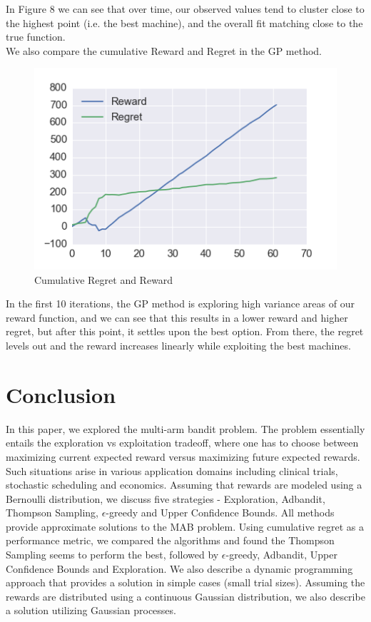 \documentclass{article}
\begin{document}
In Figure 8 we can see that over time, our observed values tend to cluster close to the highest point (i.e. the best machine), and the overall fit matching close to the true function.\\

We also compare the cumulative Reward and Regret in the GP method.

\begin{figure}[H]
\centering
\includegraphics[scale=0.8]{reward_regret.png}
\caption{Cumulative Regret and Reward}
\end{figure}

In the first 10 iterations, the GP method is exploring high variance areas of our reward function, and we can see that this results in a lower reward and higher regret, but after this point, it settles upon the best option. From there, the regret levels out and the reward increases linearly while exploiting the best machines.

\section{Conclusion}

In this paper, we explored the multi-arm bandit problem. The problem essentially entails the exploration vs exploitation tradeoff, where one has to choose between maximizing current expected reward versus maximizing future expected rewards. Such situations arise in various application domains including clinical trials, stochastic scheduling and economics. Assuming that rewards are modeled using a Bernoulli distribution, we discuss five strategies -  Exploration, Adbandit, Thompson Sampling, $\epsilon$-greedy and Upper Confidence Bounds. All methods provide approximate solutions to the MAB problem. Using cumulative regret as a performance metric, we compared the algorithms and found the Thompson Sampling seems to perform the best, followed by $\epsilon$-greedy, Adbandit, Upper Confidence Bounds and  Exploration. We also describe a dynamic programming approach that provides a solution in simple cases \big(small trial sizes\big). Assuming the rewards are distributed using a continuous Gaussian distribution, we also describe a solution utilizing Gaussian processes. 
\end{document}
